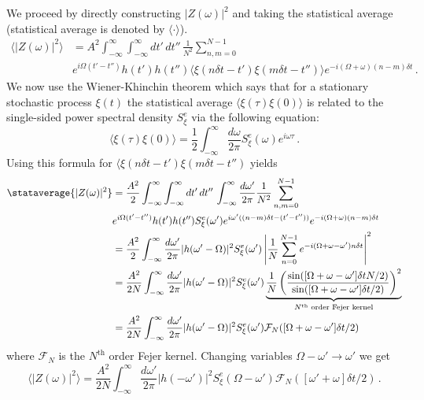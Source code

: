 We proceed by directly constructing $|Z(\omega)|^2$ and taking the statistical average (statistical average is denoted by $\langle \cdot \rangle$).
\begin{align}
\langle \left| Z(\omega) \right| ^2 \rangle
&= A^2 \int_{-\infty}^\infty \int_{-\infty}^\infty dt' \, dt'' \, \frac{1}{N^2} \sum_{n,m=0}^{N-1} \nonumber \\
& e^{i\Omega (t' - t'')} h(t') h(t'') \langle \xi(n\delta t - t') \xi(m\delta t - t'') \rangle e^{-i(\Omega + \omega)(n - m)\delta t} \, .
\end{align}
We now use the Wiener-Khinchin theorem which says that for a stationary stochastic process $\xi(t)$ the statistical average $\langle \xi(\tau) \xi(0) \rangle$  is related to the single-sided power spectral density $S^e_\xi$ via the following equation:
\begin{equation}
\langle \xi(\tau) \xi(0) \rangle = \frac{1}{2}\int_{-\infty}^\infty \frac{d\omega}{2\pi} S^e_\xi(\omega) e^{i \omega \tau} \, .
\end{equation}
Using this formula for $\langle \xi(n\delta t - t') \xi(m\delta t - t'')$ yields
\begin{align}
\stataverage{|Z(\omega)|^2}
&= \frac{A^2}{2} \int_{-\infty}^\infty \int_{-\infty}^\infty dt' \, dt'' \, \int_{-\infty}^\infty \frac{d\omega'}{2\pi}\frac{1}{N^2} \sum_{n,m=0}^{N-1} \nonumber \\
& e^{i\Omega (t' - t'')} h(t') h(t'') S^e_\xi(\omega') e^{i\omega' ((n-m)\delta t - (t' - t''))} e^{-i(\Omega + \omega)(n - m)\delta t} \\
&= \frac{A^2}{2} \int_{-\infty}^\infty \frac{d\omega'}{2\pi} |h(\omega' - \Omega)|^2 S^e_\xi(\omega') \left| \frac{1}{N} \sum_{n=0}^{N-1} e^{-i(\Omega + \omega - \omega') n \delta t} \right|^2 \\
&= \frac{A^2}{2N} \int_{-\infty}^\infty \frac{d\omega'}{2\pi} |h(\omega' - \Omega)|^2 S^e_\xi(\omega') \underbrace{
\frac{1}{N} \left( \frac{\sin([\Omega + \omega - \omega'] \delta t N / 2)}{\sin([\Omega + \omega - \omega']\delta t / 2)} \right)^2
}_{N^{\text{th}}\text{ order Fejer kernel}} \\
&= \frac{A^2}{2N} \int_{-\infty}^\infty \frac{d\omega'}{2\pi} |h(\omega' - \Omega)|^2 S^e_\xi(\omega') \mathcal{F}_N([\Omega + \omega - \omega'] \delta t / 2) \\
\end{align}
where $\mathcal{F}_N$ is the $N^{\text{th}}$ order Fejer kernel.
Changing variables $\Omega - \omega' \rightarrow \omega'$ we get
\begin{equation}
\langle |Z(\omega)|^2 \rangle =
\frac{A^2}{2N} \int_{-\infty}^\infty \frac{d\omega'}{2\pi} |h(-\omega')|^2 S^e_\xi(\Omega - \omega') \mathcal{F}_N([\omega' + \omega]\delta t / 2) \, .
\end{equation}
